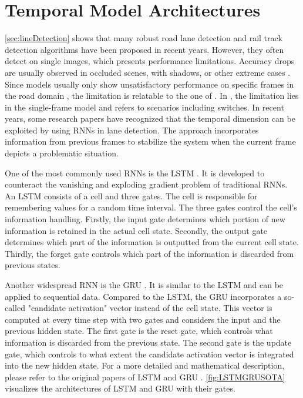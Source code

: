 \section{Temporal Model Architectures}
\label{sec:temporalModelArchitecture}

\autoref{sec:lineDetection} shows that many robust road lane detection and rail track detection algorithms have been proposed in recent years.
However, they often detect on single images, which presents performance limitations.
Accuracy drops are usually observed in occluded scenes, with shadows, or other extreme cases \cite{robustLaneDetection2020}.
Since models usually only show unsatisfactory performance on specific frames in the road domain \cite{robustLaneDetection2020}, the limitation is relatable to the one of \cite{tepNet2024}.
In \cite{tepNet2024}, the limitation lies in the single-frame model and refers to scenarios including switches.
In recent years, some research papers have recognized that the temporal dimension can be exploited by using \ac{RNN}s in lane detection.
The approach incorporates information from previous frames to stabilize the system when the current frame depicts a problematic situation.

One of the most commonly used \ac{RNN}s is the \ac{LSTM} \cite{LSTM2014}.
It is developed to counteract the vanishing and exploding gradient problem of traditional \ac{RNN}s.
An \ac{LSTM} consists of a cell and three gates.
The cell is responsible for remembering values for a random time interval.
The three gates control the cell's information handling.
Firstly, the input gate determines which portion of new information is retained in the actual cell state.
Secondly, the output gate determines which part of the information is outputted from the current cell state.
Thirdly, the forget gate controls which part of the information is discarded from previous states.

Another widespread \ac{RNN} is the \ac{GRU} \cite{GRU2014}.
It is similar to the \ac{LSTM} and can be applied to sequential data.
Compared to the \ac{LSTM}, the \ac{GRU} incorporates a so-called "candidate activation" vector instead of the cell state.
This vector is computed at every time step with two gates and considers the input and the previous hidden state.
The first gate is the reset gate, which controls what information is discarded from the previous state.
The second gate is the update gate, which controls to what extent the candidate activation vector is integrated into the new hidden state.
For a more detailed and mathematical description, please refer to the original papers of \ac{LSTM} \cite{LSTM2014} and \ac{GRU} \cite{GRU2014}.
\autoref{fig:LSTMGRUSOTA} visualizes the architectures of \ac{LSTM} and \ac{GRU} with their gates.

